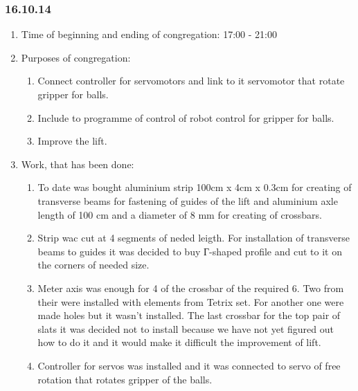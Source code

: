 
\subsubsection{16.10.14}

\begin{enumerate}
	\item Time of beginning and ending of congregation:
	17:00 - 21:00
	\item Purposes of congregation:
	\begin{enumerate}
	  \item Connect controller for servomotors and link to it servomotor that rotate gripper for balls.
	  
	  \item Include to programme of control of robot control for gripper for balls.
	  
	  \item Improve the lift.
	  
    \end{enumerate}
	\item Work, that has been done:
	\begin{enumerate}
	  \item To date was bought aluminium strip 100cm x 4cm x 0.3cm for creating of transverse beams for fastening of guides of the lift and aluminium axle length of 100 cm and a diameter of 8 mm for creating of crossbars.
      
      \item Strip wac cut at 4 segments of neded leigth. For installation of transverse beams to guides it was decided to buy Г-shaped profile and cut to it on the corners of needed size.
      
      \item Meter axis was enough for 4 of the crossbar of the required 6. Two from their were installed with elements from Tetrix set. For another one were made holes but it wasn't installed. The last crossbar for the top pair of slats it was decided not to install because we have not yet figured out how to do it and it would make it difficult the improvement of lift.
      
      \item Controller for servos was installed and it was connected to servo of free rotation that rotates gripper of the balls.
      

\end{enumerate}
\end{enumerate}
